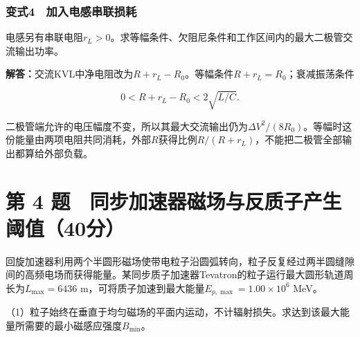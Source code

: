 \documentclass[12pt,a4paper,fontset=fandol]{ctexart}
\begin{document}
\par\noindent\begin{minipage}{\linewidth}
\subsubsection{变式4　加入电感串联损耗}\label{ux53d8ux5f0f4-ux52a0ux5165ux7535ux611fux4e32ux8054ux635fux8017}

电感另有串联电阻\(r_L>0\)。求等幅条件、欠阻尼条件和工作区间内的最大二极管交流输出功率。

\textbf{解答：}交流KVL中净电阻改为\(R+r_L-R_0\)。等幅条件\(R+r_L=R_0\)；衰减振荡条件

\[
0<R+r_L-R_0<2\sqrt{L/C}.
\]

二极管端允许的电压幅度不变，所以其最大交流输出仍为\(\Delta V^2/(8R_0)\)。等幅时这份能量由两项电阻共同消耗，外部\(R\)获得比例\(R/(R+r_L)\)，不能把二极管全部输出都算给外部负载。

\end{minipage}\par
\clearpage

\section{第 4
题　同步加速器磁场与反质子产生阈值（40分）}\label{ux7b2c-4-ux9898-ux540cux6b65ux52a0ux901fux5668ux78c1ux573aux4e0eux53cdux8d28ux5b50ux4ea7ux751fux9608ux503c40ux5206}

回旋加速器利用两个半圆形磁场使带电粒子沿圆弧转向，粒子反复经过两半圆缝隙间的高频电场而获得能量。某同步质子加速器Tevatron的粒子运行最大圆形轨道周长为\(L_{\max}=6436\)
m，可将质子加速到最大能量\(E_{p,\max}=1.00\times10^6\) MeV。

（1）粒子始终在垂直于均匀磁场的平面内运动，不计辐射损失。求达到该最大能量所需要的最小磁感应强度\(B_{\min}\)。

\begin{center}
\begin{minipage}{\linewidth}
\centering\begingroup{}
\ifdim\wd\diagrambox>.88\linewidth
\sbox{\diagrambox}{\resizebox{.88\linewidth}{!}{\usebox{\diagrambox}}}\fi
\ifdim\ht\diagrambox>.38\textheight
\resizebox{!}{.38\textheight}{\usebox{\diagrambox}}
\else\usebox{\diagrambox}\fi
\par{}\endgroup\end{minipage}\end{center}
\end{document}

